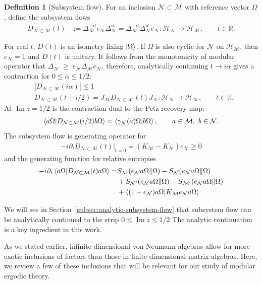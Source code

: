 \documentclass[a4paper,11pt]{article}
\theoremstyle{definition}
\newtheorem{definition}{Definition}[section]
\newcommand{\nn}{\nonumber}
\newcommand{\mN}{\mathcal{N}}
\newcommand{\mH}{\mathcal{H}}
\newcommand{\mM}{\mathcal{M}}
\begin{document}
\begin{definition}[Subsystem flow]\label{def:subsystem-flow}
For an inclusion $\mN\subset\mM$ with reference vector $\Omega$, define the subsystem flows
\begin{align}
 D_{\mN\subset\mM}(t)&:=\Delta_{\mM}^{-it}e_\mN\Delta_{\mN}^{it}
 =\Delta_{\mM}^{-it}\Delta_{\mN}^{it}e_\mN
 :\mH_{\mN}\longrightarrow\mH_{\mM},\qquad t\in\mathbb R.
 \label{eq:subsystem-flow-general}
\end{align}
\end{definition}
For real $t$, $D(t)$ is an isometry fixing $\ket{\Omega}$. If $\Omega$ is also cyclic for $\mN$ on $\mH_{\mM}$, then $e_\mN=1$ and $D(t)$ is unitary. It follows from the monotonicity of modular operator that $\Delta_{\mN}\;\geq\;e_\mN\Delta_{\mM}e_\mN$, therefore, analytically continuing $t\to i\alpha$ gives a contraction for $0\le\alpha\le1/2$:
\begin{align}
 &|D_{\mN\subset\mM}(i\alpha)|\le1\nn\\
 &D_{\mN\subset\mM}(t+i/2)=J_\mM D_{\mN\subset\mM}(t)J_\mN:\mH_{\mN}\longrightarrow\mH_{\mM},\qquad t\in\mathbb R.
 \label{eq:subsystem-flow-contraction}
\end{align}
At $\operatorname{Im}z=1/2$ is the contraction dual to the Petz recovery map:
\begin{align}
\braket{a\Omega|D_{\mN\subset\mM}(i/2)b\Omega}=\braket{\gamma_\mN(a)\Omega|b\Omega},\qquad a\in\mM,\ b\in\mN.
\end{align}
The subsystem flow is generating operator for
\begin{align}
-i\partial_t D_{\mN\subset\mM}(t)\big|_{t=0}
 =(K_\mM-K_\mN)e_\mN\geq 0
 \label{eq:subsystem-flow-generator}
\end{align}
and the generating function for relative entropies
\begin{align}
-i\partial_t\braket{a\Omega|D_{\mN\subset\mM}(t)a\Omega}
 =&S_\mM(e_\mN a\Omega\|\Omega)-S_\mN(e_\mN a\Omega\|\Omega)\nn\\
 &+S_{\mN'}(e_\mN a\Omega\|\Omega)-S_{\mM'}(e_\mN a\Omega\|\Omega)\\
 &+\braket{(1-e_\mN)a\Omega|K_\mM e_\mN a\Omega}\nn
\end{align}

We will see in Section~\ref{subsec:analytic-subsystem-flow} that subsystem flow can be analytically continued to the strip $0\le\operatorname{Im}z\le1/2$
The analytic continuation is a key ingredient in this work.


As we stated earlier, infinite-dimensional von Neumann algebras allow for more exotic inclusions of factors than those in finite-dimensional matrix algebras. Here, we review a few of these inclusions that will be relevant for our study of modular ergodic theory.
\end{document}
